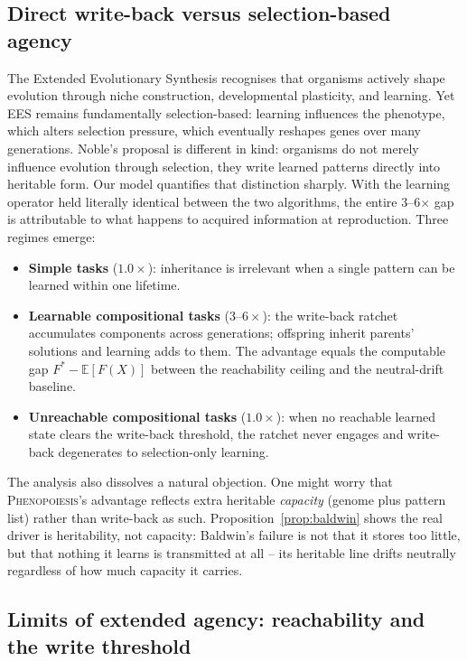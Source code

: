 \documentclass[11pt]{article}
\newcommand{\Pheno}{\textsc{Phenopoiesis}}
\begin{document}
\subsection{Direct write-back versus selection-based agency}

The Extended Evolutionary Synthesis recognises that organisms actively shape
evolution through niche construction, developmental plasticity, and learning.
Yet EES remains fundamentally selection-based: learning influences the
phenotype, which alters selection pressure, which eventually reshapes genes
over many generations. Noble's proposal is different in kind: organisms do
not merely influence evolution through selection, they write learned patterns
directly into heritable form. Our model quantifies that distinction
sharply. With the learning operator held literally identical between the two
algorithms, the entire 3--6$\times$ gap is attributable to what happens to
acquired information at reproduction. Three regimes emerge:

\begin{itemize}
  \item \textbf{Simple tasks} ($1.0\times$): inheritance is irrelevant when a
        single pattern can be learned within one lifetime.
  \item \textbf{Learnable compositional tasks} ($3$--$6\times$): the
        write-back ratchet accumulates components across generations;
        offspring inherit parents' solutions and learning adds to them. The
        advantage equals the computable gap $F^* - \mathbb{E}[F(X)]$ between
        the reachability ceiling and the neutral-drift baseline.
  \item \textbf{Unreachable compositional tasks} ($1.0\times$): when no
        reachable learned state clears the write-back threshold, the ratchet
        never engages and write-back degenerates to selection-only learning.
\end{itemize}

The analysis also dissolves a natural objection. One might worry that
\Pheno{}'s advantage reflects extra heritable \emph{capacity} (genome plus
pattern list) rather than write-back as such. Proposition~\ref{prop:baldwin}
shows the real driver is heritability, not capacity: Baldwin's failure is
not that it stores too little, but that nothing it learns is transmitted at
all -- its heritable line drifts neutrally regardless of how much capacity it
carries.

\subsection{Limits of extended agency: reachability and the write threshold}
\end{document}
